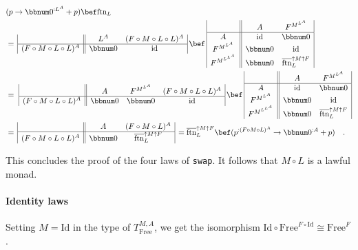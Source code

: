 \begin{align*}
 & (p\rightarrow\bbnum 0^{:L^{A}}+p)\bef\text{ftn}_{L}\\
 & =\,\begin{array}{|c||cc|}
 & L^{A} & (F\circ M\circ L\circ L)^{A}\\
\hline (F\circ M\circ L\circ L)^{A} & \bbnum 0 & \text{id}
\end{array}\,\bef\,\begin{array}{|c||cc|}
 & A & F^{M^{L^{A}}}\\
\hline A & \text{id} & \bbnum 0\\
F^{M^{L^{A}}} & \bbnum 0 & \text{id}\\
F^{M^{L^{L^{A}}}} & \bbnum 0 & \overline{\text{ftn}}_{L}^{\uparrow M\uparrow F}
\end{array}\\
 & =\,\,\begin{array}{|c||ccc|}
 & A & F^{M^{L^{A}}} & (F\circ M\circ L\circ L)^{A}\\
\hline (F\circ M\circ L\circ L)^{A} & \bbnum 0 & \bbnum 0 & \text{id}
\end{array}\,\bef\,\begin{array}{|c||cc|}
 & A & F^{M^{L^{A}}}\\
\hline A & \text{id} & \bbnum 0\\
F^{M^{L^{A}}} & \bbnum 0 & \text{id}\\
F^{M^{L^{L^{A}}}} & \bbnum 0 & \overline{\text{ftn}}_{L}^{\uparrow M\uparrow F}
\end{array}\\
 & =\,\begin{array}{|c||cc|}
 & A & (F\circ M\circ L)^{A}\\
\hline (F\circ M\circ L\circ L)^{A} & \bbnum 0 & \overline{\text{ftn}}_{L}^{\uparrow M\uparrow F}
\end{array}\,=\overline{\text{ftn}}_{L}^{\uparrow M\uparrow F}\bef(p^{:(F\circ M\circ L)^{A}}\rightarrow\bbnum 0^{:A}+p)\quad.
\end{align*}

This concludes the proof of the four laws of \lstinline!swap!. It
follows that $M\circ L$ is a lawful monad.

\paragraph{Identity laws}

Setting $M=\text{Id}$ in the type of $T_{\text{Free}}^{M,A}$, we
get the isomorphism $\text{Id}\circ\text{Free}^{F\circ\text{Id}}\cong\text{Free}^{F}$.

